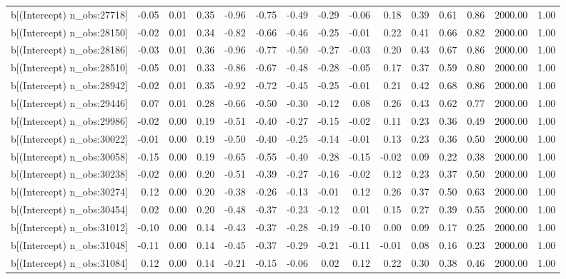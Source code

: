 \begin{table}[ht]
\begin{tabular}{rrrrrrrrrrrrrrr}
  b[(Intercept) n\_obs:27718] & -0.05 & 0.01 & 0.35 & -0.96 & -0.75 & -0.49 & -0.29 & -0.06 & 0.18 & 0.39 & 0.61 & 0.86 & 2000.00 & 1.00 \\ 
  b[(Intercept) n\_obs:28150] & -0.02 & 0.01 & 0.34 & -0.82 & -0.66 & -0.46 & -0.25 & -0.01 & 0.22 & 0.41 & 0.66 & 0.82 & 2000.00 & 1.00 \\ 
  b[(Intercept) n\_obs:28186] & -0.03 & 0.01 & 0.36 & -0.96 & -0.77 & -0.50 & -0.27 & -0.03 & 0.20 & 0.43 & 0.67 & 0.86 & 2000.00 & 1.00 \\ 
  b[(Intercept) n\_obs:28510] & -0.05 & 0.01 & 0.33 & -0.86 & -0.67 & -0.48 & -0.28 & -0.05 & 0.17 & 0.37 & 0.59 & 0.80 & 2000.00 & 1.00 \\ 
  b[(Intercept) n\_obs:28942] & -0.02 & 0.01 & 0.35 & -0.92 & -0.72 & -0.45 & -0.25 & -0.01 & 0.21 & 0.42 & 0.68 & 0.86 & 2000.00 & 1.00 \\ 
  b[(Intercept) n\_obs:29446] & 0.07 & 0.01 & 0.28 & -0.66 & -0.50 & -0.30 & -0.12 & 0.08 & 0.26 & 0.43 & 0.62 & 0.77 & 2000.00 & 1.00 \\ 
  b[(Intercept) n\_obs:29986] & -0.02 & 0.00 & 0.19 & -0.51 & -0.40 & -0.27 & -0.15 & -0.02 & 0.11 & 0.23 & 0.36 & 0.49 & 2000.00 & 1.00 \\ 
  b[(Intercept) n\_obs:30022] & -0.01 & 0.00 & 0.19 & -0.50 & -0.40 & -0.25 & -0.14 & -0.01 & 0.13 & 0.23 & 0.36 & 0.50 & 2000.00 & 1.00 \\ 
  b[(Intercept) n\_obs:30058] & -0.15 & 0.00 & 0.19 & -0.65 & -0.55 & -0.40 & -0.28 & -0.15 & -0.02 & 0.09 & 0.22 & 0.38 & 2000.00 & 1.00 \\ 
  b[(Intercept) n\_obs:30238] & -0.02 & 0.00 & 0.20 & -0.51 & -0.39 & -0.27 & -0.16 & -0.02 & 0.12 & 0.23 & 0.37 & 0.50 & 2000.00 & 1.00 \\ 
  b[(Intercept) n\_obs:30274] & 0.12 & 0.00 & 0.20 & -0.38 & -0.26 & -0.13 & -0.01 & 0.12 & 0.26 & 0.37 & 0.50 & 0.63 & 2000.00 & 1.00 \\ 
  b[(Intercept) n\_obs:30454] & 0.02 & 0.00 & 0.20 & -0.48 & -0.37 & -0.23 & -0.12 & 0.01 & 0.15 & 0.27 & 0.39 & 0.55 & 2000.00 & 1.00 \\ 
  b[(Intercept) n\_obs:31012] & -0.10 & 0.00 & 0.14 & -0.43 & -0.37 & -0.28 & -0.19 & -0.10 & 0.00 & 0.09 & 0.17 & 0.25 & 2000.00 & 1.00 \\ 
  b[(Intercept) n\_obs:31048] & -0.11 & 0.00 & 0.14 & -0.45 & -0.37 & -0.29 & -0.21 & -0.11 & -0.01 & 0.08 & 0.16 & 0.23 & 2000.00 & 1.00 \\ 
  b[(Intercept) n\_obs:31084] & 0.12 & 0.00 & 0.14 & -0.21 & -0.15 & -0.06 & 0.02 & 0.12 & 0.22 & 0.30 & 0.38 & 0.46 & 2000.00 & 1.00 \\ 

\end{tabular}
\end{table}
